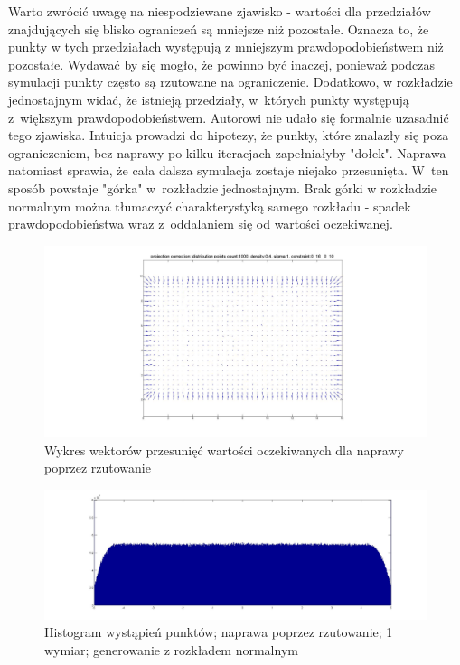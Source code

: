 \documentclass{mini}
\begin{document}
Warto zwrócić uwagę na niespodziewane zjawisko - wartości dla przedziałów znajdujących się blisko ograniczeń są mniejsze niż pozostałe. Oznacza to, że punkty w tych przedziałach występują z mniejszym prawdopodobieństwem niż pozostałe. Wydawać by się mogło, że powinno być inaczej, ponieważ podczas symulacji punkty często są rzutowane na ograniczenie. Dodatkowo, w rozkładzie jednostajnym widać, że istnieją przedziały, w~których punkty występują z~większym prawdopodobieństwem. Autorowi nie udało się formalnie uzasadnić tego zjawiska. Intuicja prowadzi do hipotezy, że punkty, które znalazły się poza ograniczeniem, bez naprawy po kilku iteracjach zapełniałyby "dołek". Naprawa natomiast sprawia, że cała dalsza symulacja zostaje niejako przesunięta. W~ten sposób powstaje "górka" w~rozkładzie jednostajnym. Brak górki w rozkładzie normalnym można tłumaczyć charakterystyką samego rozkładu - spadek prawdopodobieństwa wraz z~oddalaniem się od wartości oczekiwanej.

\begin{figure}[H]
\centering
\includegraphics[width=\textwidth]{projection2dprzesuniecie}
\caption{Wykres wektorów przesunięć wartości oczekiwanych dla naprawy poprzez rzutowanie}
\end{figure}

\begin{figure}[H]
\centering
\includegraphics[width=\textwidth]{p_n_50M_1__5_5}
\caption{Histogram wystąpień punktów; naprawa poprzez rzutowanie; 1 wymiar; generowanie z rozkładem normalnym}
\label{bladzenie:rzutowanie1dn}
\end{figure}
\end{document}
